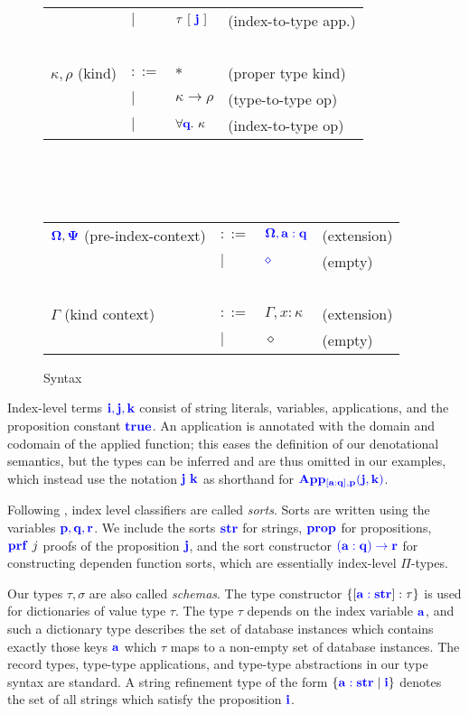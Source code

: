 \documentclass[sigplan,10pt,review,anonymous]{acmart}
\newcommand{\blu}[1]{\textbf{\color{blue}{#1}}}
\newcommand{\blum}[1]{\mathbf{\color{blue}{#1}}}
\begin{document}
\begin{figure}
\begin{tabular}{llll}
       & $\mid$ & $\tau~[~\blu{j}~]$ & (index-to-type app.)\\
~ & ~ & ~ & ~ \\
$\kappa,\rho$ (kind) & $::=$ & $\ast$ & (proper type kind) \\
                     & $\mid$ & $\kappa \to \rho$ & (type-to-type op)\\
                     & $\mid$ & $\forall \blu{q}.~\kappa$ & (index-to-type op)
\end{tabular}\\~\\~\\
\begin{tabular}{llll}
$\blum{\Omega}, \blum{\Psi}$ (pre-index-context) & $::=$  & $\blum{\Omega,a : q}$ & (extension) \\
                                     & $\mid$ & $\blum{\diamond}$ & (empty) \\~\\
$\Gamma$ (kind context) & $::=$ & $\Gamma,x : \kappa$ & (extension) \\
                        & $\mid$ & $\diamond$ & (empty) 
\end{tabular}
\caption{Syntax}
\label{fig:syntax}
\end{figure}

Index-level terms $\blum{i,j,k}$ consist of string literals, variables, applications, and the proposition constant $\blum{true}$. An application is annotated with the domain and codomain of the applied function; this eases the definition of our denotational semantics, but the types can be inferred and are thus omitted in our examples, which instead use the notation $\blum{j}~\blum{k}$ as shorthand for $\blum{App_{[a : q], p}(j,k)}$.

Following \cite{dependent ml journal of fp}, index level classifiers are called \emph{sorts}. Sorts are written using the variables $\blum{p,q,r}$. We include the sorts $\blum{str}$ for strings, $\blum{prop}$ for propositions, $\blum{prf}~j$ proofs of the proposition $\blum{j}$, and the sort constructor $\blum{(a : q) \to r}$ for constructing dependen function sorts, which are essentially index-level $\Pi$-types.

Our types $\tau,\sigma$ are also called \emph{schemas}. The type constructor $\{ [\blum{a : str}] : \tau \}$ is used for dictionaries of value type $\tau$. The type $\tau$ depends on the index variable $\blum{a}$, and such a dictionary type describes the set of database instances which contains exactly those keys $\blum{a}$ which $\tau$ maps to a non-empty set of database instances. The record types, type-type applications, and type-type abstractions in our type syntax are standard. A string refinement type of the form $\{ \blum{a : str} \mid \blum{i} \}$ denotes the set of all strings which satisfy the proposition $\blum{i}$.
\end{document}

